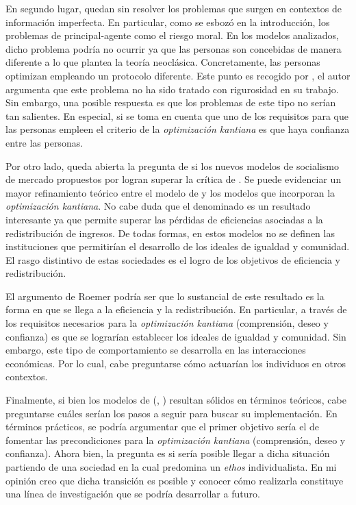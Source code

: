 En segundo lugar, quedan sin resolver los problemas que surgen en contextos de información imperfecta. En particular, como se esbozó en la introducción, los problemas de principal-agente como el riesgo moral. En los modelos analizados, dicho problema podría no ocurrir ya que las personas son concebidas de manera diferente a lo que plantea la teoría neoclásica. Concretamente, las personas optimizan empleando un protocolo diferente. Este punto es recogido por \citet{Roemer_2021b}, el autor argumenta que este problema no ha sido tratado con rigurosidad en su trabajo. Sin embargo, una posible respuesta es que los problemas de este tipo no serían tan salientes. En especial, si se toma en cuenta que uno de los requisitos para que las personas empleen el criterio de la \textit{optimización kantiana} es que haya confianza entre las personas.

Por otro lado, queda abierta la pregunta de si los nuevos modelos de socialismo de mercado propuestos por \citet{Roemer_2021a} logran superar la crítica de \citet{Cohen_2014c}. Se puede evidenciar un mayor refinamiento teórico entre el modelo de \citet{Roemer_1994} y los modelos que incorporan la \textit{optimización kantiana}. No cabe duda que el denominado  es un resultado interesante ya que permite superar las pérdidas de eficiencias asociadas a la redistribución de ingresos. De todas formas, en estos modelos no se definen las instituciones que permitirían el desarrollo de los ideales de igualdad y comunidad. El rasgo distintivo de estas sociedades es el logro de los objetivos de eficiencia y redistribución. 

El argumento de Roemer podría ser que lo sustancial de este resultado es la forma en que se llega a la eficiencia y la redistribución. En particular, a través de los requisitos necesarios para la \textit{optimización kantiana} (comprensión, deseo y confianza) es que se lograrían establecer los ideales de igualdad y comunidad. Sin embargo, este tipo de comportamiento se desarrolla en las interacciones económicas. Por lo cual, cabe preguntarse cómo actuarían los individuos en otros contextos. 

Finalmente, si bien los modelos de \citeauthor{Roemer_2019} (\citeyear{Roemer_2019}, \citeyear{Roemer_2021a}) resultan sólidos en términos teóricos, cabe preguntarse cuáles serían los pasos a seguir para buscar su implementación. En términos prácticos, se podría argumentar que el primer objetivo sería el de fomentar las precondiciones para la \textit{optimización kantiana} (comprensión, deseo y confianza). Ahora bien, la pregunta es si sería posible llegar a dicha situación partiendo de una sociedad en la cual predomina un \textit{ethos} individualista. En mi opinión creo que dicha transición es posible y conocer cómo realizarla constituye una línea de investigación que se podría desarrollar a futuro.




\newpage

